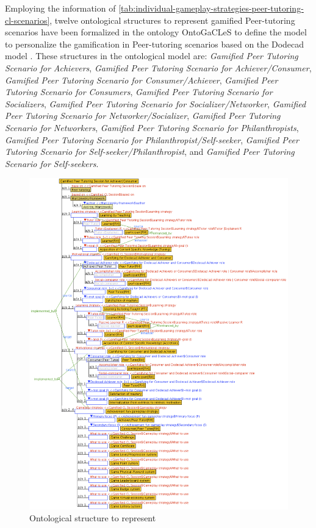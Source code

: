 Employing the information of \autoref{tab:individual-gameplay-strategies-peer-tutoring-cl-scenarios}, twelve ontological structures to represent gamified Peer-tutoring scenarios have been formalized in the ontology OntoGaCLeS to define the model to personalize the gamification in Peer-tutoring scenarios based on the Dodecad model \cite{Marczewski2015b}. These structures in the ontological model are: \emph{Gamified Peer Tutoring Scenario for Achievers}, \emph{Gamified Peer Tutoring Scenario for Achiever/Consumer}, \emph{Gamified Peer Tutoring Scenario for Consumer/Achiever}, \emph{Gamified Peer Tutoring Scenario for Consumers}, \emph{Gamified Peer Tutoring Scenario for Socializers}, \emph{Gamified Peer Tutoring Scenario for Socializer/Networker}, \emph{Gamified Peer Tutoring Scenario for Networker/Socializer}, \emph{Gamified Peer Tutoring Scenario for Networkers}, \emph{Gamified Peer Tutoring Scenario for Philanthropists}, \emph{Gamified Peer Tutoring Scenario for Philanthropist/Self-seeker}, \emph{Gamified Peer Tutoring Scenario for Self-seeker/Philanthropist}, and \emph{Gamified Peer Tutoring Scenario for Self-seekers}. 


\begin{figure}[!htbp]
 \caption[Ontological structures to represent a gamified CL scenario for dodecad socializers]{Ontological structure to represent }
 \label{fig:ontological-structure-gamified-peer-tutoring-scenario-achiever-consumer}
 \centering
  \includegraphics[width=1\textwidth]{images/chap-ontogacles1/ontological-structure-gamified-peer-tutoring-scenario-achiever-consumer.png} 
 \fautor
\end{figure}

